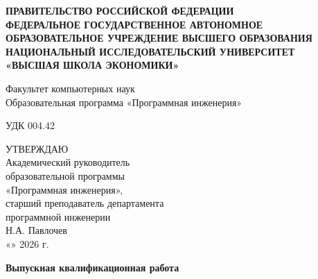 \begin{titlepage}
    \thispagestyle{empty}
    \centering

    {\footnotesize
    \textbf{ПРАВИТЕЛЬСТВО РОССИЙСКОЙ ФЕДЕРАЦИИ} \\
    \textbf{ФЕДЕРАЛЬНОЕ ГОСУДАРСТВЕННОЕ АВТОНОМНОЕ} \\
    \textbf{ОБРАЗОВАТЕЛЬНОЕ УЧРЕЖДЕНИЕ ВЫСШЕГО ОБРАЗОВАНИЯ} \\
    \textbf{НАЦИОНАЛЬНЫЙ ИССЛЕДОВАТЕЛЬСКИЙ УНИВЕРСИТЕТ} \\
    \textbf{«ВЫСШАЯ ШКОЛА ЭКОНОМИКИ»}
    }

    \vspace{0.8cm}

    {\small
    Факультет компьютерных наук \\
    Образовательная программа «Программная инженерия»
    }

    \vspace{0.9cm}

    \begin{flushleft}
        УДК 004.42
    \end{flushleft}

    \vspace{0.4cm}

    \begin{flushright}
        \begin{minipage}{0.43\textwidth}
            \centering \small
            УТВЕРЖДАЮ \\
            Академический руководитель \\
            образовательной программы \\
            «Программная инженерия», \\
            старший преподаватель департамента \\
            программной инженерии \\
            Н.А. Павлочев \\
            «\underline{\hspace{0.9cm}}» \underline{\hspace{1.9cm}} 2026 г.
        \end{minipage}
    \end{flushright}

    \vspace{1.0cm}

    \textbf{\large Выпускная квалификационная работа}

    \vspace{0.7cm}


\end{titlepage}
